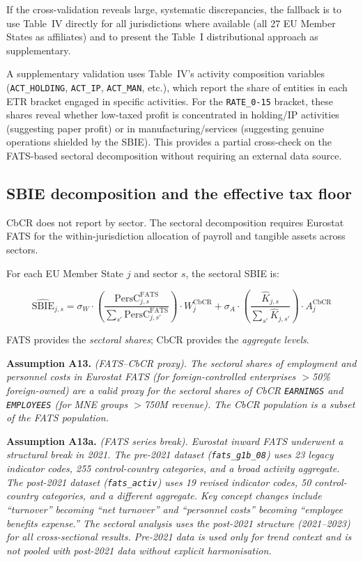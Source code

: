 \documentclass[11pt,a4paper]{article}
\newcommand{\EUR}{\texteuro}
\newcommand{\code}[1]{\texttt{#1}}
\newcommand{\assumption}[2]{\noindent\textbf{Assumption #1.} \textit{#2}\medskip}
\begin{document}
If the cross-validation reveals large, systematic discrepancies, the fallback is to use Table~IV directly for all jurisdictions where available (all 27 EU Member States as affiliates) and to present the Table~I distributional approach as supplementary.

A supplementary validation uses Table~IV's activity composition variables (\code{ACT\_HOLDING}, \code{ACT\_IP}, \code{ACT\_MAN}, etc.), which report the share of entities in each ETR bracket engaged in specific activities. For the \code{RATE\_0-15} bracket, these shares reveal whether low-taxed profit is concentrated in holding/IP activities (suggesting paper profit) or in manufacturing/services (suggesting genuine operations shielded by the SBIE). This provides a partial cross-check on the FATS-based sectoral decomposition without requiring an external data source.


\subsection{SBIE decomposition and the effective tax floor}\label{sec:sbie_decomp}


CbCR does not report by sector. The sectoral decomposition requires Eurostat FATS for the within-jurisdiction allocation of payroll and tangible assets across sectors.

For each EU Member State $j$ and sector $s$, the sectoral SBIE is:

\begin{equation}\label{eq:sbie_sectoral}
\widehat{\text{SBIE}}_{j,s} = \sigma_W \cdot \left(\frac{\text{PersC}_{j,s}^{\text{FATS}}}{\sum_{s'} \text{PersC}_{j,s'}^{\text{FATS}}}\right) \cdot W_j^{\text{CbCR}} + \sigma_A \cdot \left(\frac{\hat{K}_{j,s}}{\sum_{s'} \hat{K}_{j,s'}}\right) \cdot A_j^{\text{CbCR}}
\end{equation}

FATS provides the \emph{sectoral shares}; CbCR provides the \emph{aggregate levels}.

\assumption{A13}{(FATS--CbCR proxy). The sectoral shares of employment and personnel costs in Eurostat FATS (for foreign-controlled enterprises $>$50\% foreign-owned) are a valid proxy for the sectoral shares of CbCR \code{EARNINGS} and \code{EMPLOYEES} (for MNE groups $>$\EUR750M revenue). The CbCR population is a subset of the FATS population.}

\assumption{A13a}{(FATS series break). Eurostat inward FATS underwent a structural break in 2021. The pre-2021 dataset (\code{fats\_g1b\_08}) uses 23 legacy indicator codes, 255 control-country categories, and a broad activity aggregate. The post-2021 dataset (\code{fats\_activ}) uses 19 revised indicator codes, 50 control-country categories, and a different aggregate. Key concept changes include ``turnover'' becoming ``net turnover'' and ``personnel costs'' becoming ``employee benefits expense.'' The sectoral analysis uses the post-2021 structure (2021--2023) for all cross-sectional results. Pre-2021 data is used only for trend context and is not pooled with post-2021 data without explicit harmonisation.}
\end{document}
